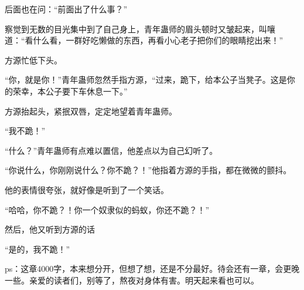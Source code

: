 \begin{this_body}
后面也在问：“前面出了什么事？”

察觉到无数的目光集中到了自己身上，青年蛊师的眉头顿时又皱起来，叫嚷道：“看什么看，一群好吃懒做的东西，再看小心老子把你们的眼睛挖出来！”

方源忙低下头。

“你，就是你！”青年蛊师忽然手指方源，“过来，跪下，给本公子当凳子。这是你的荣幸，本公子要下车休息一下。”

方源抬起头，紧抿双唇，定定地望着青年蛊师。

“我不跪！”

“什么？”青年蛊师有点难以置信，他差点以为自己幻听了。

“你说什么，你刚刚说什么？你不跪？！”他指着方源的手指，都在微微的颤抖。

他的表情很夸张，就好像是听到了一个笑话。

“哈哈，你不跪？！你一个奴隶似的蚂蚁，你还不跪？！”

然后，他又听到方源的话

“是的，我不跪！”

ps：这章4000字，本来想分开，但想了想，还是不分最好。待会还有一章，会更晚一些。亲爱的读者们，别等了，熬夜对身体有害。明天起来看也可以。

\end{this_body}

